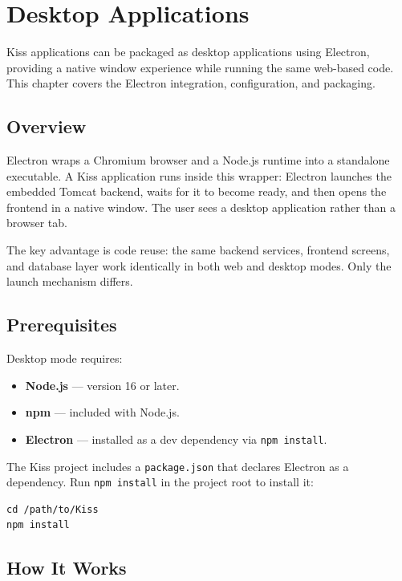 \chapter{Desktop Applications}
\label{ch:desktop}

Kiss applications can be packaged as desktop applications using Electron, providing a native window experience while running the same web-based code.  This chapter covers the Electron integration, configuration, and packaging.

\section{Overview}
\label{sec:desk-overview}

Electron wraps a Chromium browser and a Node.js runtime into a standalone executable.  A Kiss application runs inside this wrapper: Electron launches the embedded Tomcat backend, waits for it to become ready, and then opens the frontend in a native window.  The user sees a desktop application rather than a browser tab.

The key advantage is code reuse: the same backend services, frontend screens, and database layer work identically in both web and desktop modes.  Only the launch mechanism differs.

\section{Prerequisites}
\label{sec:desk-prereqs}

Desktop mode requires:

\begin{itemize}
  \item \textbf{Node.js} --- version 16 or later.
  \item \textbf{npm} --- included with Node.js.
  \item \textbf{Electron} --- installed as a dev dependency via \texttt{npm install}.
\end{itemize}

\noindent
The Kiss project includes a \texttt{package.json} that declares Electron as a dependency.  Run \texttt{npm install} in the project root to install it:

\begin{lstlisting}[style=shell]
cd /path/to/Kiss
npm install
\end{lstlisting}

\section{How It Works}
\label{sec:desk-how}

